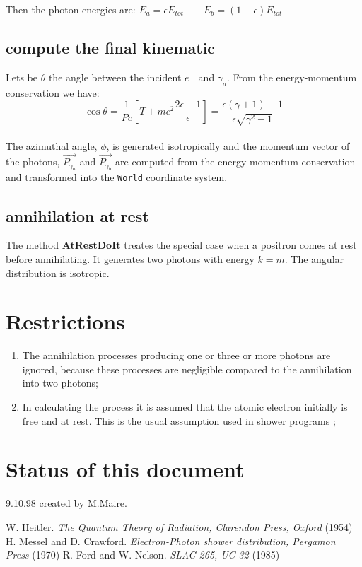 \noindent
Then the photon energies are:
 $E_a = \epsilon E_{tot} \qquad E_b = (1-\epsilon) E_{tot}$

\subsection{compute the final kinematic}
Lets be $\theta$ the angle between the incident $e^+$ and $\gamma_a$. From the
energy-momentum conservation we have:
\[
\cos \theta = \frac{1}{Pc} \left[ T+mc^2 \frac{2\epsilon -1}{\epsilon} \right]
 = \frac{\epsilon(\gamma +1) - 1}{\epsilon \sqrt{\gamma^2 -1}}
\] \\
The azimuthal angle, $\phi$, is generated isotropically and 
the momentum vector of the photons, $\vec{P_{\gamma_a}}$ and $\vec{P_{\gamma_b}}$
are computed from the energy-momentum conservation and
transformed into the {\tt World} coordinate system. 

\subsection{annihilation at rest} 
The method \textbf{AtRestDoIt} treates the special case when a positron comes 
at rest before annihilating.
It generates two photons with energy $k=m$.
The angular distribution is isotropic.

\section{Restrictions}
\begin{enumerate}
\item
The annihilation processes producing one or three or more photons are
ignored, because these processes are negligible compared to the 
annihilation into two photons\cite{egs4,messel};
\item
In calculating the process it is assumed that the atomic electron initially
is free and at rest. This is the usual assumption used in shower programs
\cite{egs4};
\end {enumerate}
\section{Status of this document}
 9.10.98  created by M.Maire.
   
\begin{thebibliography}{99}
 W. Heitler.
   {\em The Quantum Theory of Radiation, Clarendon Press, Oxford} (1954)
 H. Messel and D. Crawford.
   {\em Electron-Photon shower distribution, Pergamon Press} (1970)
 R. Ford and W. Nelson.
   {\em SLAC-265, UC-32} (1985)      
\end{thebibliography}

